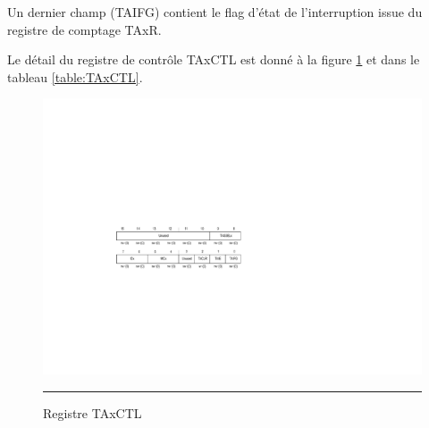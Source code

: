 Un dernier champ (TAIFG) contient le flag d'état de l'interruption issue du registre de comptage TAxR.

Le détail du registre de contrôle TAxCTL est donné à la figure \ref{fig:TAxCTL} et dans le tableau \ref{table:TAxCTL}.

\begin{figure}[h]
  \centering
  \includegraphics[angle=0, width=13cm]{./Figures/Chap5_Timer/TAxCTL.pdf}
  \rule{35em}{0.5pt}
  \caption[TAxCTL]{Registre TAxCTL}
  \label{fig:TAxCTL}
\end{figure}

